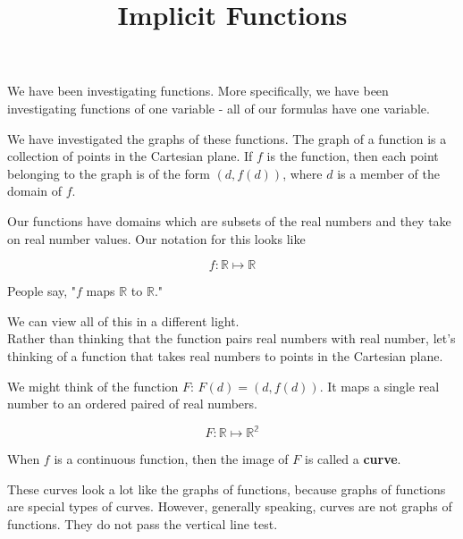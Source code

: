 \documentclass{ximera}
\title{Implicit Functions}
\begin{document}
\begin{abstract}
\end{abstract}
\maketitle








We have been investigating functions.  More specifically, we have been investigating functions of one variable - all of our formulas have one variable.

We have investigated the graphs of these functions.  The graph of a function is a collection of points in the Cartesian plane.  If $f$ is the function, then each point belonging to the graph is of the form $(d, f(d))$, where $d$ is a member of the domain of $f$.

Our functions have domains which are subsets of the real numbers and they take on real number values.  Our notation for this looks like 

\[  f : \mathbb{R} \mapsto \mathbb{R}      \]



\begin{center}
People say, "$f$ maps $\mathbb{R}$ to $\mathbb{R}$."
\end{center}




We can view all of this in a different light. \\




Rather than thinking that the function pairs real numbers with real number, let's thinking of a function that takes real numbers to points in the Cartesian plane.


We might think of the function $F$: $F(d) = (d, f(d))$.  It maps a single real number to an ordered paired of real numbers.



\[  F : \mathbb{R} \mapsto \mathbb{R^2}      \]



When $f$ is a continuous function, then the image of $F$ is called a \textbf{curve}.


These curves look a lot like the graphs of functions, because graphs of functions are special types of curves.  However, generally speaking, curves are not graphs of functions.  They do not pass the vertical line test. \\
\end{document}
